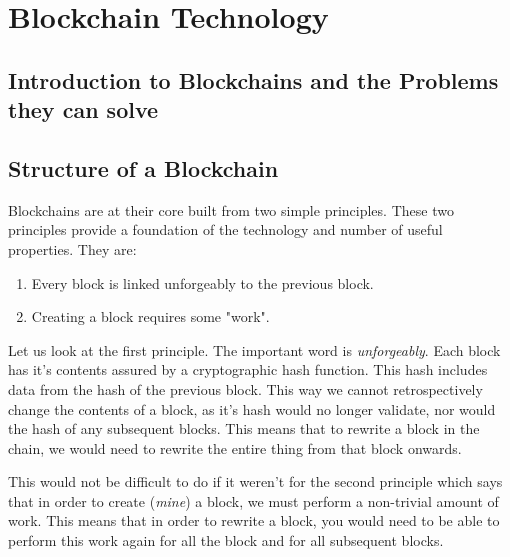 
\chapter{Blockchain Technology}
\label{ch:blockchain}

\section{Introduction to Blockchains and the Problems they can solve}
\label{ch:blockchain:intro}


\section{Structure of a Blockchain}
\label{ch:blockchain:structure}

Blockchains are at their core built from two simple principles. These two principles provide a foundation of the technology and number of useful properties. They are:

\begin{enumerate}
  \item Every block is linked unforgeably to the previous block.
  \item Creating a block requires some "work".
\end{enumerate}

Let us look at the first principle. The important word is \emph{unforgeably}. Each block has it's contents assured by a cryptographic hash function. This hash includes data from the hash of the previous block. This way we cannot retrospectively change the contents of a block, as it's hash would no longer validate, nor would the hash of any subsequent blocks. This means that to rewrite a block in the chain, we would need to rewrite the entire thing from that block onwards.


This would not be difficult to do if it weren't for the second principle which says that in order to create (\emph{mine}) a block, we must perform a non-trivial amount of work. This means that in order to rewrite a block, you would need to be able to perform this work again for all the block and for all subsequent blocks.

